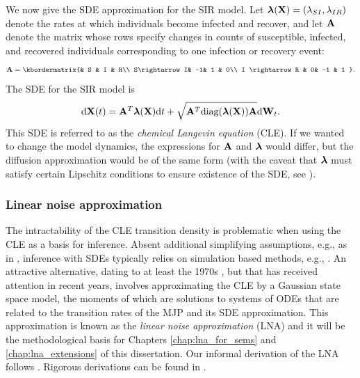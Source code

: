 We now give the SDE approximation for the SIR model. Let $ \boldsymbol{\lambda}(\mathbf{X}) = (\lambda_{SI}, \lambda_{IR}) $ denote the rates at which individuals become infected and recover, and let $ \mathbf{A} $ denote the matrix whose rows specify changes in counts of susceptible, infected, and recovered individuals corresponding to one infection or recovery event:
\begin{equation*}
\bA = \kbordermatrix{& S & I &  R\\
	S\rightarrow I& -1& 1 & 0\\
	I \rightarrow R & 0& -1 & 1
}.
\end{equation*}
The SDE for the SIR model is 
\begin{equation}
\label{eqn:sir_sde}
\mathrm{d}\mathbf{X}(t) = \mathbf{A}^T\boldsymbol{\lambda}(\mathbf{X})\mathrm{d} t + \sqrt{\mathbf{A}^T\mathrm{diag}(\boldsymbol{\lambda}(\mathbf{X}))\mathbf{A}}\mathrm{d}\mathbf{W}_t.
\end{equation}
This SDE is referred to as the \textit{chemical Langevin equation} (CLE). If we wanted to change the model dynamics, the expressions for $ \mathbf{A} $ and $ \boldsymbol{\lambda} $ would differ, but the diffusion approximation would be of the same form (with the caveat that $ \boldsymbol{\lambda} $ must satisfy certain Lipschitz conditions to ensure existence of the SDE, see \cite{fuchs2013inference,oksendal2003stochastic}). 

\subsubsection{Linear noise approximation}
\label{subsubsec:lna_background}

The intractability of the CLE transition density is problematic when using the CLE as a basis for inference. Absent additional simplifying assumptions, e.g., as in \cite{cauchemez2008}, inference with SDEs typically relies on simulation based methods, e.g., \cite{dukic2012,golightly2013simulation,golightly2018efficient}. An attractive alternative, dating to at least the 1970s \cite{kurtz1970solutions,kurtz1971limit}, but that has received attention in recent years, involves approximating the CLE by a Gaussian state space model, the moments of which are solutions to systems of ODEs that are related to the transition rates of the MJP and its SDE approximation. This approximation is known as the \textit{linear noise approximation} (LNA) and it will be the methodological basis for Chapters \ref{chap:lna_for_sems} and \ref{chap:lna_extensions} of this dissertation. Our informal derivation of the LNA follows \cite{golightly2013simulation,wilkinson2011stochastic}. Rigorous derivations can be found in \cite{elf2003fast,kurtz1981approximation,vankampen2007stochastic,wallace2012linear}. 


